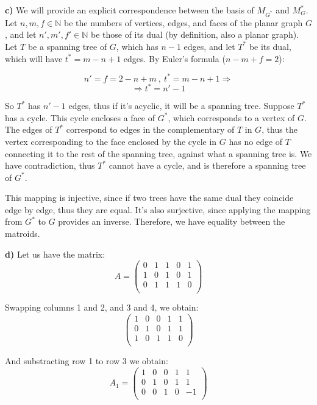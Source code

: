 \documentclass[12pt]{article}
\begin{document}
\textbf{c)} We will provide an explicit correspondence between the basis of $M_{G^{*}}$ and $M_{G}^{*}$. Let $n, m, f \in \mathbb{N}$ be the numbers of vertices, edges, and faces of the planar graph $G$, and let $n', m', f' \in \mathbb{N}$ be those of its dual (by definition, also a planar graph). Let $T$ be a spanning tree of $G$, which has $n-1$ edges, and let $T^{*}$ be its dual, which will have $t^{*} = m-n+1$ edges. By Euler's formula ($n-m+f=2$): 

$$n' = f = 2-n+m \ , \ t^{*} = m-n+1 \Rightarrow$$ $$\Rightarrow t^{*}= n'-1$$

So $T^{*}$ has $n'-1$ edges, thus if it's acyclic, it will be a spanning tree. Suppose $T^{*}$ has a cycle. This cycle encloses a face of $G^{*}$, which corresponds to a vertex of $G$. The edges of $T^{*}$ correspond to edges in the complementary of $T$ in $G$, thus the vertex corresponding to the face enclosed by the cycle in $G$ has no edge of $T$ connecting it to the rest of the spanning tree, against what a spanning tree is. We have contradiction, thus $T^{*}$ cannot have a cycle, and is therefore a spanning tree of $G^{*}$.

This mapping is injective, since if two trees have the same dual they coincide edge by edge, thus they are equal. It's also surjective, since applying the mapping from $G^{*}$ to $G$ provides an inverse. Therefore, we have equality between the matroids.

\textbf{d)} Let us have the matrix:$$A = \left( {\begin{array}{ccccc}
   0 & 1 & 1 & 0 & 1\\
   1 & 0 & 1 & 0 & 1\\
   0 & 1 & 1 & 1 & 0\\
  \end{array} } \right)$$

Swapping columns 1 and 2, and 3 and 4, we obtain: $$\left( {\begin{array}{ccccc}
   1 & 0 & 0 & 1 & 1\\
   0 & 1 & 0 & 1 & 1\\
   1 & 0 & 1 & 1 & 0\\
  \end{array} } \right)$$
  
And substracting row 1 to row 3 we obtain: $$A_{1} = \left( {\begin{array}{ccccc}
   1 & 0 & 0 & 1 & 1\\
   0 & 1 & 0 & 1 & 1\\
   0 & 0 & 1 & 0 & -1\\
  \end{array} } \right)$$
  
\end{document}
